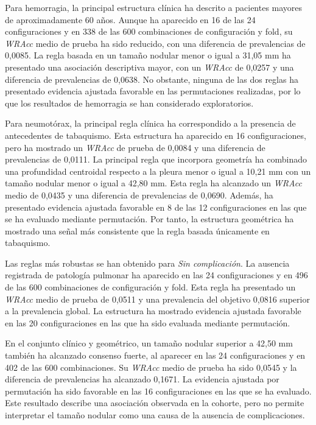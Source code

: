 Para hemorragia, la principal estructura clínica ha descrito a pacientes mayores de aproximadamente 60 años. Aunque ha aparecido en 16 de las 24 configuraciones y en 338 de las 600 combinaciones de configuración y fold, su \textit{WRAcc} medio de prueba ha sido reducido, con una diferencia de prevalencias de 0,0085. La regla basada en un tamaño nodular menor o igual a 31,05 mm ha presentado una asociación descriptiva mayor, con un \textit{WRAcc} de 0,0257 y una diferencia de prevalencias de 0,0638. No obstante, ninguna de las dos reglas ha presentado evidencia ajustada favorable en las permutaciones realizadas, por lo que los resultados de hemorragia se han considerado exploratorios.

Para neumotórax, la principal regla clínica ha correspondido a la presencia de antecedentes de tabaquismo. Esta estructura ha aparecido en 16 configuraciones, pero ha mostrado un \textit{WRAcc} de prueba de 0,0084 y una diferencia de prevalencias de 0,0111. La principal regla que incorpora geometría ha combinado una profundidad centroidal respecto a la pleura menor o igual a 10,21 mm con un tamaño nodular menor o igual a 42,80 mm. Esta regla ha alcanzado un \textit{WRAcc} medio de 0,0435 y una diferencia de prevalencias de 0,0690. Además, ha presentado evidencia ajustada favorable en 8 de las 12 configuraciones en las que se ha evaluado mediante permutación. Por tanto, la estructura geométrica ha mostrado una señal más consistente que la regla basada únicamente en tabaquismo.

Las reglas más robustas se han obtenido para \textit{Sin complicación}. La ausencia registrada de patología pulmonar ha aparecido en las 24 configuraciones y en 496 de las 600 combinaciones de configuración y fold. Esta regla ha presentado un \textit{WRAcc} medio de prueba de 0,0511 y una prevalencia del objetivo 0,0816 superior a la prevalencia global. La estructura ha mostrado evidencia ajustada favorable en las 20 configuraciones en las que ha sido evaluada mediante permutación.

En el conjunto clínico y geométrico, un tamaño nodular superior a 42,50 mm también ha alcanzado consenso fuerte, al aparecer en las 24 configuraciones y en 402 de las 600 combinaciones. Su \textit{WRAcc} medio de prueba ha sido 0,0545 y la diferencia de prevalencias ha alcanzado 0,1671. La evidencia ajustada por permutación ha sido favorable en las 16 configuraciones en las que se ha evaluado. Este resultado describe una asociación observada en la cohorte, pero no permite interpretar el tamaño nodular como una causa de la ausencia de complicaciones.


